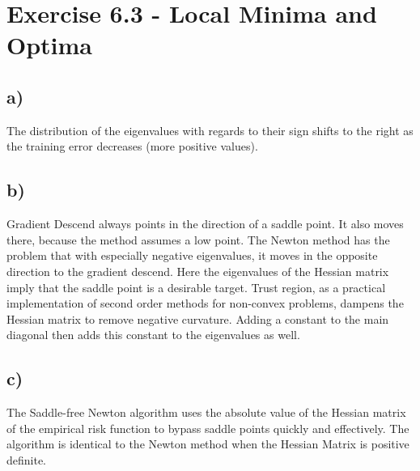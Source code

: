 \documentclass[a4paper]{article}
\begin{document}
\newpage
\section*{Exercise 6.3 - Local Minima and Optima}
    \subsection*{a)}
        The distribution of the eigenvalues with regards to their sign shifts to the right as the training error decreases (more positive values).

    \subsection*{b)}
        Gradient Descend always points in the direction of a saddle point. 
        It also moves there, because the method assumes a low point.
        The Newton method has the problem that with especially negative eigenvalues, it moves in the opposite direction to the gradient descend. Here the eigenvalues of the Hessian matrix imply that the saddle point is a desirable target.
        Trust region, as a practical implementation of second order methods for non-convex problems, dampens the Hessian matrix to remove negative curvature. Adding a constant to the main diagonal then adds this constant to the eigenvalues as well.

    \subsection*{c)}
        The Saddle-free Newton algorithm uses the absolute value of the Hessian matrix of the empirical risk function to bypass saddle points quickly and effectively.
        The algorithm is identical to the Newton method when the Hessian Matrix is positive definite.
        
\end{document}
